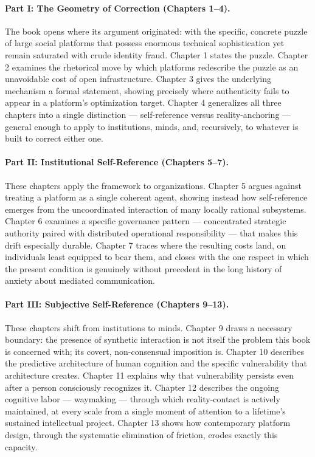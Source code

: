 \documentclass[12pt,a4paper]{book}
\begin{document}
\paragraph{Part I: The Geometry of Correction (Chapters 1–4).} The book opens where its argument originated: with the specific, concrete puzzle of large social platforms that possess enormous technical sophistication yet remain saturated with crude identity fraud. Chapter 1 states the puzzle. Chapter 2 examines the rhetorical move by which platforms redescribe the puzzle as an unavoidable cost of open infrastructure. Chapter 3 gives the underlying mechanism a formal statement, showing precisely where authenticity fails to appear in a platform's optimization target. Chapter 4 generalizes all three chapters into a single distinction — self-reference versus reality-anchoring — general enough to apply to institutions, minds, and, recursively, to whatever is built to correct either one.

\paragraph{Part II: Institutional Self-Reference (Chapters 5–7).} These chapters apply the framework to organizations. Chapter 5 argues against treating a platform as a single coherent agent, showing instead how self-reference emerges from the uncoordinated interaction of many locally rational subsystems. Chapter 6 examines a specific governance pattern — concentrated strategic authority paired with distributed operational responsibility — that makes this drift especially durable. Chapter 7 traces where the resulting costs land, on individuals least equipped to bear them, and closes with the one respect in which the present condition is genuinely without precedent in the long history of anxiety about mediated communication.

\paragraph{Part III: Subjective Self-Reference (Chapters 9–13).} These chapters shift from institutions to minds. Chapter 9 draws a necessary boundary: the presence of synthetic interaction is not itself the problem this book is concerned with; its covert, non-consensual imposition is. Chapter 10 describes the predictive architecture of human cognition and the specific vulnerability that architecture creates. Chapter 11 explains why that vulnerability persists even after a person consciously recognizes it. Chapter 12 describes the ongoing cognitive labor — waymaking — through which reality-contact is actively maintained, at every scale from a single moment of attention to a lifetime's sustained intellectual project. Chapter 13 shows how contemporary platform design, through the systematic elimination of friction, erodes exactly this capacity.
\end{document}
